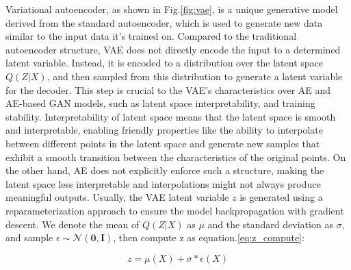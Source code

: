  
Variational autoencoder, as shown in  Fig.\ref{fig:vae}, is a unique generative model derived from the standard autoencoder, which is used to generate new data similar to the input data it's trained on. 
Compared to the traditional autoencoder structure, VAE does not directly encode the input to a determined latent variable. Instead, it is encoded to a distribution over the latent space $Q(Z|X)$, and then sampled from this distribution to generate a latent variable for the decoder. This step is crucial to the VAE's characteristics over AE and AE-based GAN models, such as latent space  interpretability, and training stability.
Interpretability of latent space means that the latent space is smooth and interpretable, enabling friendly properties like the ability to interpolate between different points in the latent space and generate new samples that exhibit a smooth transition between the characteristics of the original points. On the other hand, AE does not explicitly enforce such a structure, making the latent space less interpretable and interpolations might not always produce meaningful outputs. 
Usually, the VAE latent variable $z$ is generated using a reparameterization approach to ensure the model backpropagation with gradient descent. We denote the mean of $Q(Z|X)$ as $\mu$ and the standard deviation as $\sigma$, and sample $\epsilon \sim \mathcal{N}(\textbf{0}, \textbf{I} ) $, then compute z as equation.\eqref{eq:z_compute}:

\begin{equation}
	\label{eq:z_compute}
	z = \mu(\textit{X}) + \sigma \ast \epsilon(\textit{X})
\end{equation}









